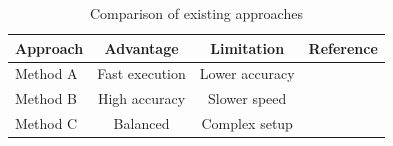 \begin{table}[ht]
    \centering
    \caption{Comparison of existing approaches}
    \label{tab:approach_comparison}
    \begin{tabular}{@{}lccc@{}}
        \toprule
        \textbf{Approach} & \textbf{Advantage} & \textbf{Limitation} & \textbf{Reference} \\
        \midrule
        Method A & Fast execution & Lower accuracy & \cite{sample_ref1} \\
        Method B & High accuracy & Slower speed & \cite{sample_ref2} \\
        Method C & Balanced & Complex setup & \cite{sample_conf1} \\
        \bottomrule
    \end{tabular}
\end{table}